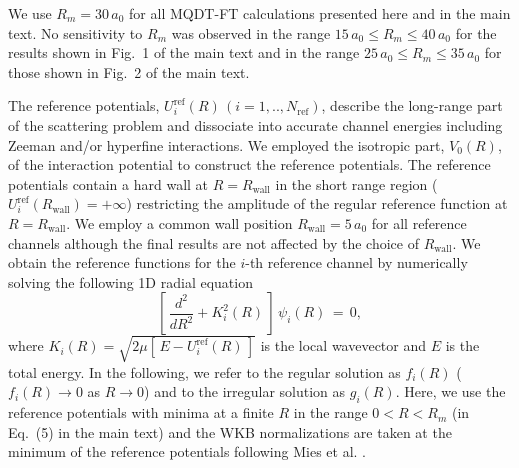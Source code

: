 \documentclass[reprint,amssymb,noeprint,twocolumn,longbibliography]{revtex4-2}
\begin{document}
We use $R_m=30\, a_0$ for all MQDT-FT calculations presented  here and in the main text. No sensitivity to $R_m$ was observed in the range  $15\, a_0 \leq R_m \leq 40\, a_0$ for the results shown in Fig.~1 of the main text and in the range $25\, a_0 \leq R_m \leq 35\, a_0$  for those shown in Fig.~2 of the main text.




The reference potentials, $U_i^\text{ref}(R)\, (i=1,..,N_\text{ref})$, describe the long-range part of the scattering problem and dissociate into accurate channel energies including Zeeman and/or hyperfine interactions.
We employed the isotropic part, $V_0(R)$, of the interaction potential to construct the reference potentials. The reference potentials contain a hard wall at $R=R_\text{wall}$ in the short range region ($U_i^\text{ref}(R_\text{wall})=+\infty$) restricting the amplitude of the regular reference function at $R=R_\text{wall}$.
We employ a common wall position $R_\text{wall}=5\,a_\text{0}$ for all reference channels although the final results are not affected by the choice of $R_\mathrm{wall}$. 
We obtain the reference functions for the $i$-th reference channel by numerically solving the following 1D radial equation \cite{Mies_84,Croft_11}
\begin{equation}
\label{eq:1Deq}
\left[\, \frac{d^2}{dR^2}+K_i^2(R)\, \right]\, \psi_i(R)\, =\, 0,
\end{equation}
where $K_i(R)=\sqrt{2\mu[\,E-U_i^\mathrm{ref}(R)\,]}$ is the local wavevector and $E$ is the total energy.
In the following, we refer to the regular solution as $f_i(R)$ ($f_i(R) \to 0$ as $R \to 0$) and to the irregular solution as $g_i(R)$. 
Here, we use the reference potentials with minima at a finite $R$ in the range $0<R<R_m$ (in Eq.~(5) in the main text) and the WKB normalizations are taken at the minimum of the reference potentials following Mies et al. \cite{Mies_84}. 
\end{document}
